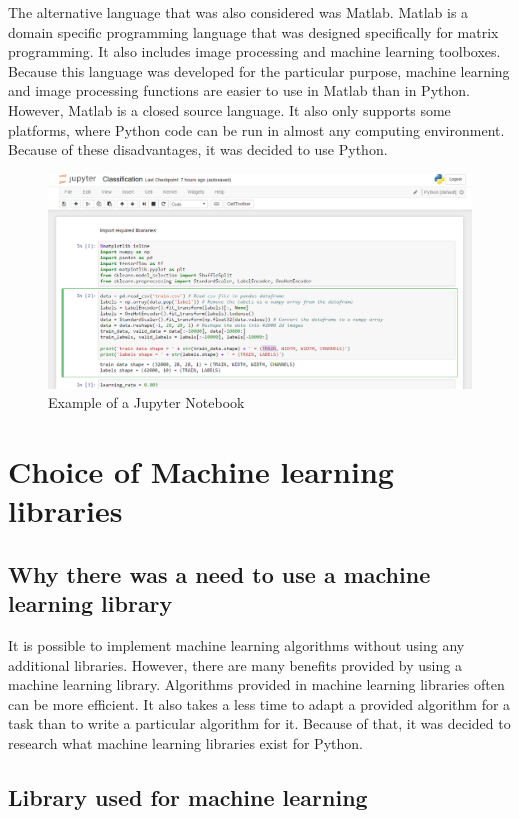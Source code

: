 The alternative language that was also considered was Matlab. Matlab is a domain specific programming language that was designed specifically for matrix programming. It also includes image processing and machine learning toolboxes. Because this language was developed for the particular purpose, machine learning and image processing functions are easier to use in Matlab than in Python. However, Matlab is a closed source language. It also only supports some platforms, where Python code can be run in almost any computing environment. Because of these disadvantages, it was decided to use Python.

\begin{figure}[ht]
\centering
\includegraphics[width=14cm]{Figures/c3/c3jupyter.PNG}
\caption{Example of a Jupyter Notebook}
\label{fig:jupyter}
\end{figure}


\section{Choice of Machine learning libraries}

\subsection{Why there was a need to use a machine learning library}

It is possible to implement machine learning algorithms without using any additional libraries. However, there are many benefits provided by using a  machine learning library. Algorithms provided in machine learning libraries often can be more efficient. It also takes a less time to adapt a provided algorithm for a task than to write a particular algorithm for it. Because of that, it was decided to research what machine learning libraries exist for Python.

\subsection{Library used for machine learning }


